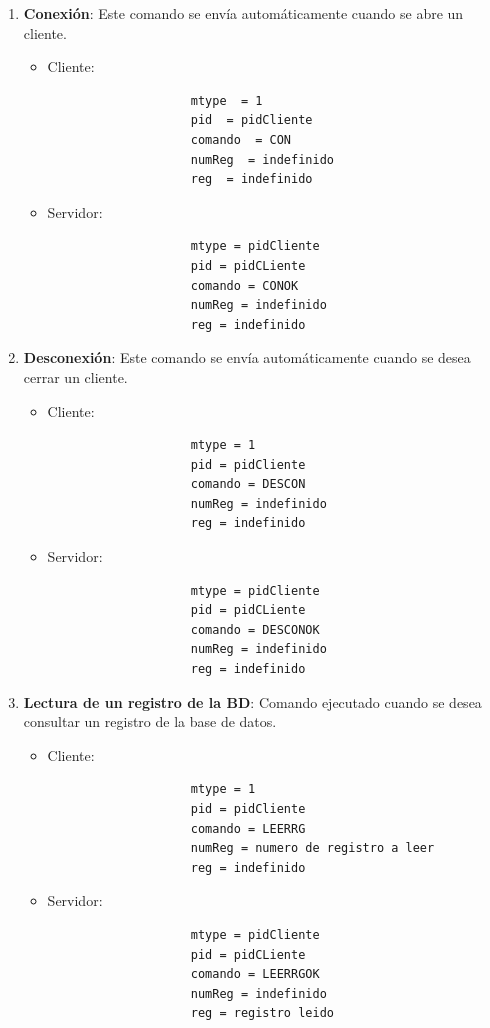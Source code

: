 \documentclass[a4paper,10pt]{article}
\begin{document}
	\begin{enumerate}
		\item{\bf Conexi\'on}: Este comando se env\'ia autom\'aticamente cuando se abre un cliente.
			\begin{itemize}
				\item Cliente:
				\begin{verbatim}
					mtype  = 1
					pid  = pidCliente
					comando  = CON
					numReg  = indefinido
					reg  = indefinido
				\end{verbatim}
				\item Servidor:
				\begin{verbatim}
					mtype = pidCliente 
					pid = pidCLiente
					comando = CONOK
					numReg = indefinido
					reg = indefinido
				\end{verbatim}
			\end{itemize}
		\item{\bf Desconexi\'on}: Este comando se env\'ia autom\'aticamente cuando se desea cerrar un cliente.
			\begin{itemize}
				\item Cliente:
				\begin{verbatim}
					mtype = 1
					pid = pidCliente
					comando = DESCON 
					numReg = indefinido
					reg = indefinido
				\end{verbatim}
				\item Servidor:
				\begin{verbatim}
					mtype = pidCliente 
					pid = pidCLiente
					comando = DESCONOK 
					numReg = indefinido
					reg = indefinido
				\end{verbatim}
			\end{itemize}
		\item{\bf Lectura de un registro de la BD}: Comando ejecutado cuando se desea consultar un registro de la base de datos.
			\begin{itemize}
				\item Cliente:
				\begin{verbatim}
					mtype = 1
					pid = pidCliente
					comando = LEERRG 
					numReg = numero de registro a leer
					reg = indefinido
				\end{verbatim}
				\item Servidor:
				\begin{verbatim}
					mtype = pidCliente 
					pid = pidCLiente
					comando = LEERRGOK
					numReg = indefinido
					reg = registro leido
				\end{verbatim}
			\end{itemize}

\end{enumerate}
\end{document}

